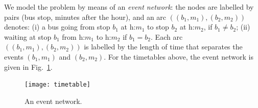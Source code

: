 \documentclass[a4paper]{book}
\theoremstyle{changebreak}                %
\begin{document}
We model the problem by means of an {\it event
  network}: the nodes are
labelled by pairs (bus stop, minutes after the hour), and
an arc $((b_1,m_1),(b_2,m_2))$ denotes: (i) a bus going
from stop $b_1$ at h:$m_1$ to stop $b_2$ at h:$m_2$, if $b_1\not=b_2$;
(ii) waiting at stop $b_1$ from h:$m_1$ to h:$m_2$ if $b_1=b_2$. Each
arc $((b_1,m_1),(b_2,m_2))$ is labelled by the length of time that
separates the events $(b_1,m_1)$ and $(b_2,m_2)$.  For the timetables
above, the event network is given in Fig.~\ref{f:eventgraph}.

\begin{figure}[!ht]
\begin{center}
\texttt{[image: timetable]}
\end{center}
\caption{An event network.}
\label{f:eventgraph}
\end{figure}
\end{document}
